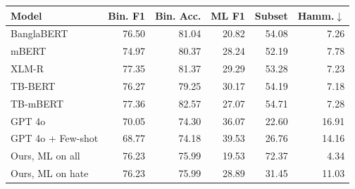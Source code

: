 \begin{tabular}{lrrrrr}
\toprule
Model & Bin. F1 & Bin. Acc. & ML F1 & Subset & Hamm.$\downarrow$ \\
\midrule
BanglaBERT & 76.50 & 81.04 & 20.82 & 54.08 & 7.26 \\
mBERT & 74.97 & 80.37 & 28.24 & 52.19 & 7.78 \\
XLM-R & 77.35 & 81.37 & 29.29 & 53.28 & 7.23 \\
TB-BERT & 76.27 & 79.25 & 30.17 & 54.19 & 7.18 \\
TB-mBERT & 77.36 & 82.57 & 27.07 & 54.71 & 7.28 \\
GPT 4o & 70.05 & 74.30 & 36.07 & 22.60 & 16.91 \\
GPT 4o + Few-shot & 68.77 & 74.18 & 39.53 & 26.76 & 14.16 \\
\midrule
Ours, ML on all & 76.23 & 75.99 & 19.53 & 72.37 & 4.34 \\
Ours, ML on hate & 76.23 & 75.99 & 28.89 & 31.45 & 11.03 \\
\bottomrule
\end{tabular}
